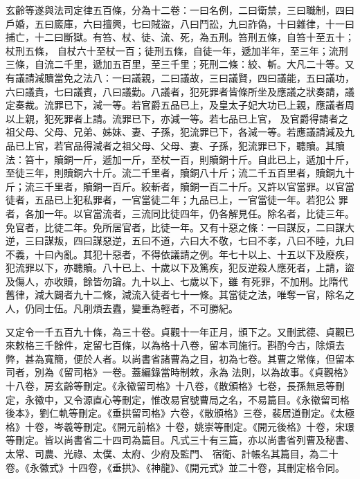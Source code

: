 \begin{pinyinscope}
 玄齡等遂與法司定律五百條，分為十二卷：一曰名例，二曰衛禁，三曰職制，四曰戶婚，五曰廄庫，六曰擅興，七曰賊盜，八曰鬥訟，九曰詐偽，十曰雜律，十一曰捕亡，十二曰斷獄。有笞、杖、徒、流、死，為五刑。笞刑五條，自笞十至五十；杖刑五條，
 自杖六十至杖一百；徒刑五條，自徒一年，遞加半年，至三年；流刑三條，自流二千里，遞加五百里，至三千里；死刑二條：絞、斬。大凡二十等。又有議請減贖當免之法八：一曰議親，二曰議故，三曰議賢，四曰議能，五曰議功，六曰議貴，七曰議賓，八曰議勤。八議者，犯死罪者皆條所坐及應議之狀奏請，議定奏裁。流罪已下，減一等。若官爵五品已上，及皇太子妃大功已上親，應議者周以上親，犯死罪者上請。流罪已下，亦減一等。若七品已上官，
 及官爵得請者之祖父母、父母、兄弟、姊妹、妻、子孫，犯流罪已下，各減一等。若應議請減及九品已上官，若官品得減者之祖父母、父母、妻、子孫，犯流罪已下，聽贖。其贖法：笞十，贖銅一斤，遞加一斤，至杖一百，則贖銅十斤。自此已上，遞加十斤，至徒三年，則贖銅六十斤。流二千里者，贖銅八十斤；流二千五百里者，贖銅九十斤；流三千里者，贖銅一百斤。絞斬者，贖銅一百二十斤。又許以官當罪。以官當徒者，五品已上犯私罪者，一官當徒二年；九品已上，一官當徒一年。若犯公
 罪者，各加一年。以官當流者，三流同比徒四年，仍各解見任。除名者，比徒三年。免官者，比徒二年。免所居官者，比徒一年。又有十惡之條：一曰謀反，二曰謀大逆，三曰謀叛，四曰謀惡逆，五曰不道，六曰大不敬，七曰不孝，八曰不睦，九曰不義，十曰內亂。其犯十惡者，不得依議請之例。年七十以上、十五以下及廢疾，犯流罪以下，亦聽贖。八十已上、十歲以下及篤疾，犯反逆殺人應死者，上請，盜及傷人，亦收贖，餘皆勿論。九十以上、七歲以下，雖
 有死罪，不加刑。比隋代舊律，減大闢者九十二條，減流入徒者七十一條。其當徒之法，唯奪一官，除名之人，仍同士伍。凡削煩去蠹，變重為輕者，不可勝紀。



 又定令一千五百九十條，為三十卷。貞觀十一年正月，頒下之。又刪武德、貞觀已來敕格三千餘件，定留七百條，以為格十八卷，留本司施行。斟酌今古，除煩去弊，甚為寬簡，便於人者。以尚書省諸曹為之目，初為七卷。其曹之常條，但留本司者，別為《留司格》一卷。蓋編錄當時制敕，永為
 法則，以為故事。《貞觀格》十八卷，房玄齡等刪定。《永徽留司格》十八卷，《散頒格》七卷，長孫無忌等刪定，永徽中，又令源直心等刪定，惟改易官號曹局之名，不易篇目。《永徽留司格後本》，劉仁軌等刪定。《垂拱留司格》六卷，《散頒格》三卷，裴居道刪定。《太極格》十卷，岑羲等刪定。《開元前格》十卷，姚崇等刪定。《開元後格》十卷，宋璟等刪定。皆以尚書省二十四司為篇目。凡式三十有三篇，亦以尚書省列曹及秘書、太常、司農、光祿、太僕、太府、少府及監門、
 宿衛、計帳名其篇目，為二十卷。《永徽式》十四卷，《垂拱》、《神龍》、《開元式》並二十卷，其刪定格令同。




\end{pinyinscope}
